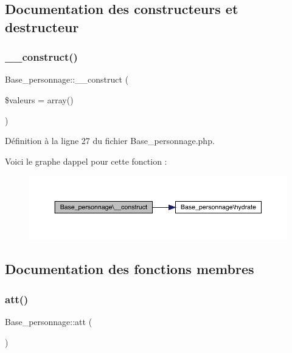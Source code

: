 \subsection{Documentation des constructeurs et destructeur}
\mbox{\label{class_base__personnage_adc8ce28bfa1d2fffd9e568fbb25a0104}} 
\subsubsection{\texorpdfstring{\+\_\+\+\_\+construct()}{\_\_construct()}}
{\footnotesize\ttfamily Base\+\_\+personnage\+::\+\_\+\+\_\+construct (\begin{DoxyParamCaption}\item[{}]{\$valeurs = {\ttfamily array()} }\end{DoxyParamCaption})}



Définition à la ligne 27 du fichier Base\+\_\+personnage.\+php.

Voici le graphe d\textquotesingle{}appel pour cette fonction \+:\nopagebreak
\begin{figure}[H]
\begin{center}
\leavevmode
\includegraphics[width=350pt]{class_base__personnage_adc8ce28bfa1d2fffd9e568fbb25a0104_cgraph}
\end{center}
\end{figure}


\subsection{Documentation des fonctions membres}
\mbox{\label{class_base__personnage_ad09642245bba8747d0ebd3ab991c66b9}} 
\subsubsection{\texorpdfstring{att()}{att()}}
{\footnotesize\ttfamily Base\+\_\+personnage\+::att (\begin{DoxyParamCaption}{ }\end{DoxyParamCaption})}



